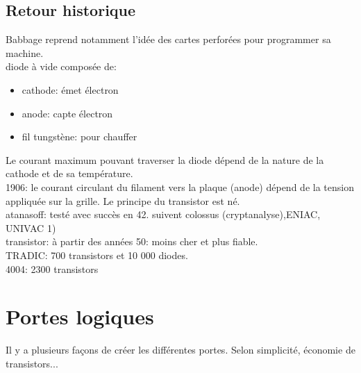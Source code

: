 \documentclass[a4paper,11pt]{article}
\begin{document}
\begin{Form}
\begin{commentprof}
\section*{Retour historique}
Babbage reprend notamment l'idée des cartes perforées pour programmer sa machine.\\diode à vide composée de:
\begin{itemize}
\item cathode: émet électron
\item anode: capte électron
\item fil tungstène: pour chauffer
\end{itemize}
Le courant maximum pouvant traverser la diode dépend de la nature de la cathode et de sa température.\\1906: le courant circulant du filament vers la plaque (anode) dépend de la tension appliquée sur la grille. Le principe du transistor est né.\\atanasoff: testé avec succès en 42. suivent colossus (cryptanalyse),ENIAC, UNIVAC 1)\\transistor: à partir des années 50: moins cher et plus fiable.\\TRADIC: 700 transistors et 10 000 diodes.\\4004: 2300 transistors 
\end{commentprof}
\section{Portes logiques}
\begin{commentprof}
Il y a plusieurs façons de créer les différentes portes. Selon simplicité, économie de transistors...
\end{commentprof}

\end{Form}
\end{document}
